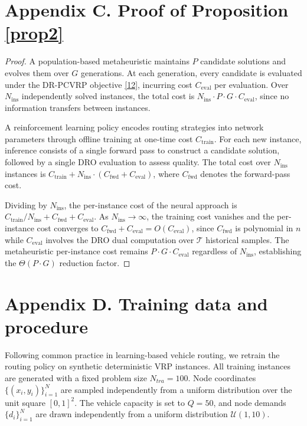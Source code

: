 \documentclass[preprint,12pt,authoryear]{elsarticle}
\theoremstyle{definition}
\begin{document}
\section*{Appendix C. Proof of Proposition \ref{prop2}}

\begin{proof}
A population-based metaheuristic maintains $P$ candidate solutions and evolves them over $G$ generations. At each generation, every candidate is evaluated under the DR-PCVRP objective \eqref{12}, incurring cost $C_{\mathrm{eval}}$ per evaluation. Over $N_{\mathrm{ins}}$ independently solved instances, the total cost is $N_{\mathrm{ins}} \cdot P \cdot G \cdot C_{\mathrm{eval}}$, since no information transfers between instances.
 
A reinforcement learning policy encodes routing strategies into network parameters through offline training at one-time cost $C_{\mathrm{train}}$. For each new instance, inference consists of a single forward pass to construct a candidate solution, followed by a single DRO evaluation to assess quality. The total cost over $N_{\mathrm{ins}}$ instances is $C_{\mathrm{train}} + N_{\mathrm{ins}} \cdot (C_{\mathrm{fwd}} + C_{\mathrm{eval}})$, where $C_{\mathrm{fwd}}$ denotes the forward-pass cost.

Dividing by $N_{\mathrm{ins}}$, the per-instance cost of the neural approach is $C_{\mathrm{train}} / N_{\mathrm{ins}} + C_{\mathrm{fwd}} + C_{\mathrm{eval}}$. As $N_{\mathrm{ins}} \to \infty$, the training cost vanishes and the per-instance cost converges to $C_{\mathrm{fwd}} + C_{\mathrm{eval}} = O(C_{\mathrm{eval}})$, since $C_{\mathrm{fwd}}$ is polynomial in $n$ while $C_{\mathrm{eval}}$ involves the DRO dual computation over $\mathcal{T}$ historical samples. The metaheuristic per-instance cost remains $P \cdot G \cdot C_{\mathrm{eval}}$ regardless of $N_{\mathrm{ins}}$, establishing the $\Theta(P \cdot G)$ reduction factor.
\end{proof}

\section*{Appendix D. Training data and procedure}

Following common practice in learning-based vehicle routing, we retrain the routing policy on synthetic deterministic VRP instances. All training instances are generated with a fixed problem size $N_{tra}=100$. Node coordinates $\{(x_i, y_i)\}_{i=1}^N$ are sampled independently from a uniform distribution over the unit square $[0,1]^2$. The vehicle capacity is set to $Q=50$, and node demands $\{d_i\}_{i=1}^N$ are drawn independently from a uniform distribution $\mathcal{U}(1,10)$.
\end{document}
